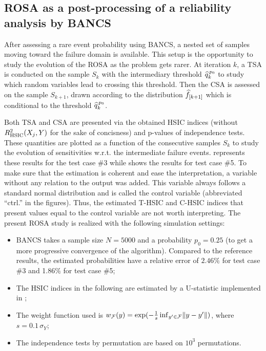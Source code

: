 \subsection{ROSA as a post-processing of a reliability analysis by BANCS}

After assessing a rare event probability using BANCS, a nested set of samples moving toward the failure domain is available.
This setup is the opportunity to study the evolution of the ROSA as the problem gets rarer.
At iteration $k$, a TSA is conducted on the sample $S_k$ with the intermediary threshold $\widehat{q}^{\, p_0}_k$ to study which random variables lead to crossing this threshold. 
Then the CSA is assessed on the sample $S_{k+1}$, drawn according to the distribution $\widehat{f}_{[k+1]}$ which is conditional to the threshold $\widehat{q}^{\, p_0}_k$. 

Both TSA and CSA are presented via the obtained HSIC indices (without $R^2_{\mathrm{HSIC}}(X_j, Y)$ for the sake of concisness) and p-values of independence tests. 
These quantities are plotted as a function of the consecutive samples $S_k$ to study the evolution of sensitivities w.r.t. the intermediate failure events. 
 represents these results for the test case \#3 while  shows the results for test case \#5. 
To make sure that the estimation is coherent and ease the interpretation, a variable without any relation to the output was added. 
This variable always follows a standard normal distribution and is called the control variable (abbreviated ``ctrl.'' in the figures). 
Thus, the estimated T-HSIC and C-HSIC indices that present values equal to the control variable are not worth interpreting. 
The present ROSA study is realized with the following simulation settings:
\begin{itemize}
    \item BANCS takes a sample size $N=5000$ and a probability $p_0=0.25$ (to get a more progressive convergence of the algorithm). Compared to the reference results, the estimated probabilities have a relative error of $2.46\%$ for test case \#3 and 1.86$\%$ for test case \#5; 
    \item The HSIC indices in the following are estimated by a U-statistic implemented in \ot; 
    \item The weight function used is $w_{\mathcal{F}}(y) = \exp(-\frac1s \, \mathrm{inf}_{y'\in \mathcal{F}} \Vert y -y' \Vert)$, where $s=0.1 \, \sigma_Y$;
    \item The independence tests by permutation are based on $10^3$ permutations.
\end{itemize}


